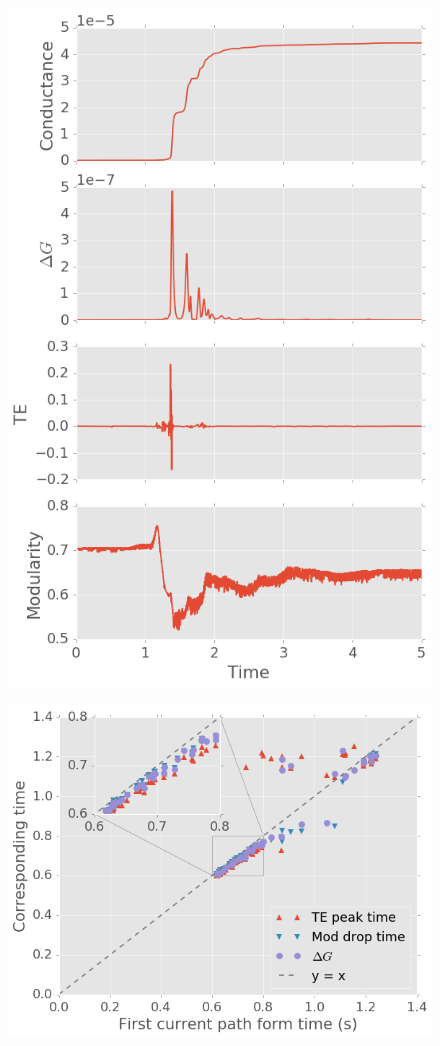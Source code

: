 \documentclass[%
 reprint,
 amsmath,amssymb,
 aps,
]{revtex4-2}
\begin{document}
\begin{figure}
	\centering
	\includegraphics[width=1\linewidth]{figure/time_series}
	\caption{}
	\label{fig:time_series}
\end{figure}

\begin{figure}[h]
	\centering
	\includegraphics[width=1\linewidth]{figure/time_align}
	\caption{}
	\label{fig:time_align}
\end{figure}
\end{document}
